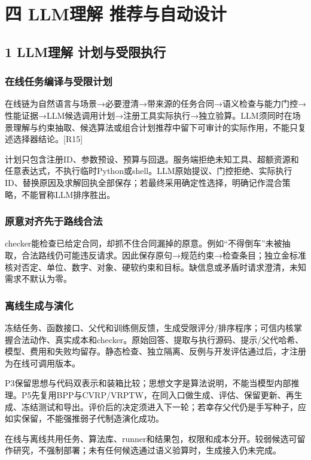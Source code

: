 \documentclass[11pt,a4paper]{article}
\newcommand{\bodytext}[1]{#1\par}
\begin{document}
\section{四 LLM理解 推荐与自动设计}
\subsection{1  LLM理解 计划与受限执行}
\subsubsection{在线任务编译与受限计划}
\bodytext{在线链为自然语言与场景→必要澄清→带来源的任务合同→语义检查与能力门控→性能证据→LLM候选调用计划→注册工具实际执行→独立验算。LLM须同时在场景理解与约束抽取、候选算法或组合计划推荐中留下可审计的实际作用，不能只复述选择器结论。[R15]}
\bodytext{计划只包含注册ID、参数预设、预算与回退。服务端拒绝未知工具、超额资源和任意表达式，不执行临时Python或shell。LLM原始提议、门控拒绝、实际执行ID、替换原因及求解回执全部保存；若最终采用确定性选择，明确记作混合策略，不能冒称LLM排序胜出。}
\subsubsection{原意对齐先于路线合法}
\bodytext{checker能检查已给定合同，却抓不住合同漏掉的原意。例如“不得倒车”未被抽取，合法路线仍可能违反请求。因此保存原句→规范约束→检查条目；独立金标准核对否定、单位、数字、对象、硬软约束和目标。缺信息或矛盾时请求澄清，未知需求不默认为零。}
\subsubsection{离线生成与演化}
\bodytext{冻结任务、函数接口、父代和训练侧反馈，生成受限评分/\allowbreak{}排序程序；可信内核掌握合法动作、真实成本和checker。原始回答、提取与执行源码、提示/\allowbreak{}父代哈希、模型、费用和失败均留存。静态检查、独立隔离、反例与开发评估通过后，才注册为在线可调用版本。}
\bodytext{P3保留思想与代码双表示和装箱比较；思想文字是算法说明，不能当模型内部推理。P5先复用BPP与CVRP/\allowbreak{}VRPTW，在同入口做生成、评估、保留更新、再生成、冻结测试和导出。评价后的决定须进入下一轮；若幸存父代仍是手写种子，应如实保留，不能强推弱子代制造演化成功。}
\bodytext{在线与离线共用任务、算法库、runner和结果包，权限和成本分开。较弱候选可留作研究，不强制部署；未有任何候选通过语义验算时，生成接入仍未完成。}
\end{document}
